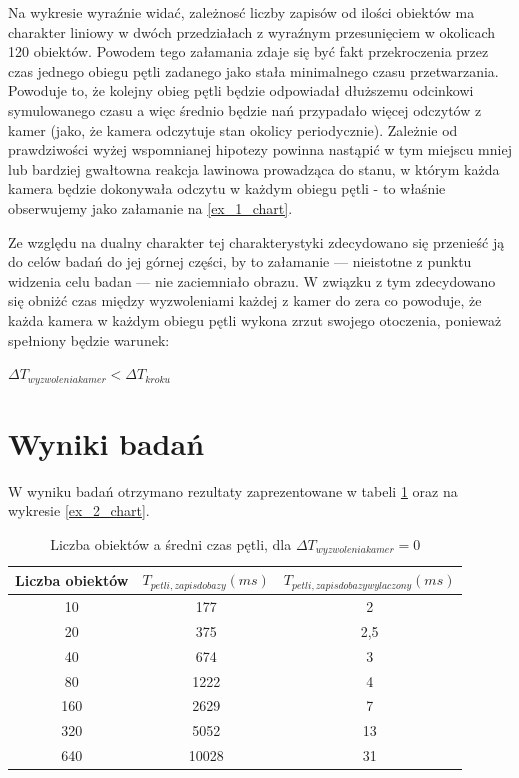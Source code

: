 \par{
Na wykresie wyraźnie widać, zależnosć liczby zapisów od ilości obiektów ma charakter liniowy w dwóch przedziałach z wyraźnym przesunięciem w okolicach 120 obiektów. Powodem tego załamania zdaje się być fakt przekroczenia przez czas jednego obiegu pętli zadanego jako stała minimalnego czasu przetwarzania.  Powoduje to, że kolejny obieg pętli będzie odpowiadał dłuższemu odcinkowi symulowanego czasu a więc średnio będzie nań przypadało więcej odczytów z kamer (jako, że kamera odczytuje stan okolicy periodycznie). Zależnie od prawdziwości wyżej wspomnianej hipotezy powinna nastąpić w tym miejscu mniej lub bardziej gwałtowna reakcja lawinowa prowadząca do stanu, w którym każda kamera będzie dokonywała odczytu w każdym obiegu pętli - to właśnie obserwujemy jako załamanie na \ref{ex_1_chart}.
}
\par{
Ze względu na dualny charakter tej charakterystyki zdecydowano się przenieść ją do celów badań do jej górnej części, by to załamanie --- nieistotne z punktu widzenia celu badan --- nie zaciemniało obrazu. W związku z tym zdecydowano się obniżć czas między wyzwoleniami każdej z kamer do zera co powoduje, że każda kamera w każdym obiegu pętli wykona zrzut swojego otoczenia, ponieważ spełniony będzie warunek:
}
\par{
\begin{center}
$\Delta T_{wyzwolenia kamer} < \Delta T_{kroku}$
\end{center}
}

\section{Wyniki badań}
\par{
W wyniku badań otrzymano rezultaty zaprezentowane w tabeli \ref{ex_2} oraz na wykresie \ref{ex_2_chart}.
}

\par{
\begin{table}[t]
\caption{Liczba obiektów a średni czas pętli, dla $\Delta T_{wyzwolenia kamer} = 0$}
\label{ex_2}
\begin{center}
\begin{tabular}{|c|c|c|}
  \hline 
  \textbf{Liczba obiektów} & \textbf{$T_{petli, zapis do bazy} (ms)$} & \textbf{$T_{petli, zapis do bazy wylaczony} (ms)$}\\
  \hline
10 & 177 & 2 \\
20 & 375 & 2,5 \\
40 & 674 & 3 \\
80 & 1222 & 4 \\
160 & 2629 & 7 \\
320 & 5052 & 13 \\
640 & 10028 & 31 \\
  \hline  
\end{tabular}
\end{center}
\end{table}
}

